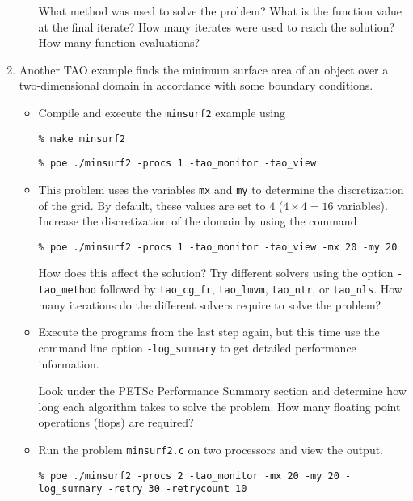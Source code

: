 \documentclass[11pt]{article}
\begin{document}
\begin{enumerate}
\begin{itemize}
  What method was used to solve the problem?
  What is the function value at the final iterate?
  How many iterates were used to reach the solution?
  How many function evaluations?

 \newpage

\end{itemize}

\item
Another TAO example finds the minimum surface area of an object over a
two-dimensional domain in accordance with some boundary conditions.

\begin{itemize}

\item
Compile and execute the \texttt{minsurf2} example using

\texttt{\% make minsurf2}

\texttt{\% poe ./minsurf2 -procs 1 -tao\_monitor -tao\_view}

\item
This problem uses the variables {\tt mx} and {\tt my} to determine
the discretization of the grid.  By default, these values are set to
$4$ ($4 \times 4 = 16$ variables). Increase the discretization of the
domain by using the command

\texttt{\% poe ./minsurf2 -procs 1 -tao\_monitor -tao\_view -mx 20 -my 20}

How does this affect the solution?
Try different solvers using the option \texttt{-tao\_method} followed by
\texttt{tao\_cg\_fr},
\texttt{tao\_lmvm}, \texttt{tao\_ntr}, or \texttt{tao\_nls}.
How many iterations do the different solvers require to solve the problem?

\item
Execute the programs from the last step again, but this time use the command line option
\texttt{-log\_summary} to get detailed performance information.

Look under the PETSc Performance Summary section and determine how long
each algorithm takes to solve the problem. How many floating point operations (flops) are required?


\item
Run the problem \texttt{minsurf2.c} on two processors and view the output.

\texttt{\% poe ./minsurf2 -procs 2 -tao\_monitor -mx 20 -my 20 -log\_summary -retry 30 -retrycount 10}

\end{itemize}


\end{enumerate}
\end{document}
